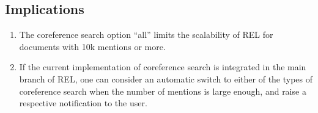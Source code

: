 \documentclass[a4paper,11pt]{article}
\numberwithin{equation}{section} %
\begin{document}
\subsection{Implications}

\begin{enumerate}
 \item The coreference search option ``all'' limits the scalability of REL for documents with 10k mentions or more.
 \item If the current implementation of coreference search is integrated in the main branch of REL, one can consider an automatic switch to either of the types of coreference search when the number of mentions is large enough, and raise a respective notification to the user. 
\end{enumerate}





\end{document}
